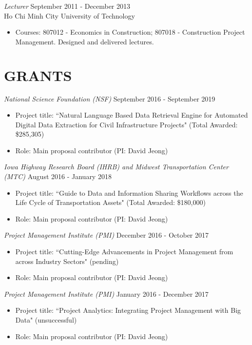 \documentclass[11pt]{res}
\begin{document}
\begin{resume}
{\sl Lecturer} \hfill September 2011 - December 2013 \\
Ho Chi Minh City University of Technology
\begin{itemize}
\item Courses: 807012 - Economics in Construction; 807018 - Construction Project Management.   Designed and delivered lectures. 
\end{itemize} 

 
\section{GRANTS}

{\sl National Science Foundation (NSF)} \hfill September 2016 - September 2019 
\begin{itemize}
\item Project title: ``Natural Language Based Data Retrieval Engine for Automated Digital Data Extraction for Civil Infrastructure Projects" (Total Awarded: \$285,305)
\item Role: Main proposal contributor (PI: David Jeong)
\end{itemize} 

{\sl Iowa Highway Research Board (IHRB) and Midwest Transportation Center (MTC)} \hfill August 2016 - January 2018
\begin{itemize}
\item Project title: ``Guide to Data and Information Sharing Workflows across the Life Cycle of Transportation Assets" (Total Awarded: \$180,000)
\item Role: Main proposal contributor (PI: David Jeong)
\end{itemize} 

{\sl Project Management Institute (PMI)} \hfill December 2016 - October 2017
\begin{itemize}
\item Project title: ``Cutting-Edge Advancements in Project Management from across Industry Sectors" (pending)
\item Role: Main proposal contributor (PI: David Jeong)
\end{itemize}

{\sl Project Management Institute (PMI)} \hfill January 2016 -  December 2017
\begin{itemize}
\item Project title: ``Project Analytics: Integrating Project Management with Big Data" (unsuccessful)
\item Role: Main proposal contributor (PI: David Jeong)
\end{itemize}


\end{resume}
\end{document}
